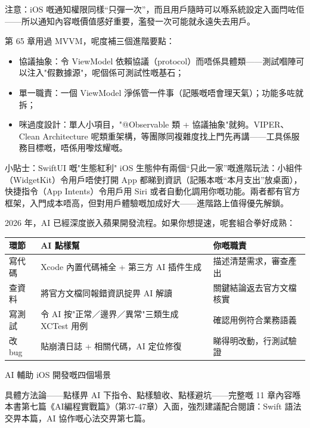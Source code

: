注意：iOS 嘅通知權限同樣“只彈一次”，而且用戶隨時可以喺系統設定入面閂咗佢——所以通知內容嘅價值感好重要，濫發一次可能就永遠失去用戶。


第 65 章用過 MVVM，呢度補三個進階要點：

\begin{itemize}
  \item 協議抽象：令 ViewModel 依賴協議（protocol）而唔係具體類——測試嗰陣可以注入"假數據源"，呢個係可測試性嘅基石；
  \item 單一職責：一個 ViewModel 淨係管一件事（記賬嘅唔會理天氣）；功能多咗就拆；
  \item 咪過度設計：單人小項目，"@Observable 類 + 協議抽象"就夠。VIPER、Clean Architecture 呢類重架構，等團隊同複雜度找上門先再講——工具係服務目標嘅，唔係用嚟炫耀嘅。
\end{itemize}

\begin{tcbinfo}{小貼士：SwiftUI 嘅"生態紅利"}
iOS 生態仲有兩個“只此一家”嘅進階玩法：小組件（WidgetKit）令用戶唔使打開 App 都睇到資訊（記賬本嘅“本月支出”放桌面），快捷指令（App Intents）令用戶用 Siri 或者自動化調用你嘅功能。兩者都有官方框架，入門成本唔高，但對用戶體驗嘅加成好大——進階路上值得優先解鎖。

\end{tcbinfo}


2026 年，AI 已經深度嵌入蘋果開發流程。如果你想提速，呢套組合拳好成熟：

\begin{center}
\begin{tabularx}{\linewidth}{|X|X|X|}
\hline
\textbf{環節} & \textbf{AI 點樣幫} & \textbf{你嘅職責} \tabularnewline
\hline
寫代碼 & Xcode 內置代碼補全 + 第三方 AI 插件生成 & 描述清楚需求，審查產出 \tabularnewline
查資料 & 將官方文檔同報錯資訊掟畀 AI 解讀 & 關鍵結論返去官方文檔核實 \tabularnewline
寫測試 & 令 AI 按"正常／邊界／異常"三類生成 XCTest 用例 & 確認用例符合業務語義 \tabularnewline
改 bug & 貼崩潰日誌 + 相關代碼，AI 定位修復 & 睇得明改動，行測試驗證 \tabularnewline
\hline
\end{tabularx}
\end{center}

\begin{center}\small\color{gray}AI 輔助 iOS 開發嘅四個場景\end{center}

具體方法論——點樣畀 AI 下指令、點樣驗收、點樣避坑——完整嘅 11 章內容喺本書第七篇《AI編程實戰篇》（第37-47章）入面，強烈建議配合閱讀：Swift 語法交畀本篇，AI 協作嘅心法交畀第七篇。

